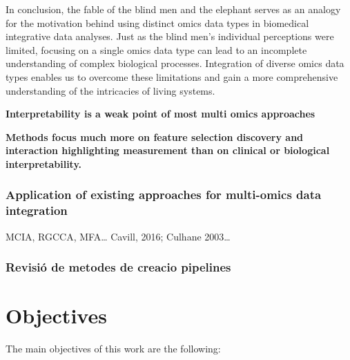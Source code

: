 \documentclass[a4paper, nobind]{templates/ociamthesis}
\renewcommand{\chaptermark}[1]{\markboth{\thechapter. #1}{\thechapter. #1}}
\begin{document}
In conclusion, the fable of the blind men and the elephant serves as an analogy for the motivation behind using distinct omics data types in biomedical integrative data analyses. Just as the blind men's individual perceptions were limited, focusing on a single omics data type can lead to an incomplete understanding of complex biological processes. Integration of diverse omics data types enables us to overcome these limitations and gain a more comprehensive understanding of the intricacies of living systems.

\textbf{Interpretability is a weak point of most multi omics approaches}

\textbf{Methods focus much more on feature selection discovery and interaction highlighting measurement than on clinical or biological interpretability.}

\hypertarget{application-of-existing-approaches-for-multi-omics-data-integration}{%
\subsection{Application of existing approaches for multi-omics data integration}\label{application-of-existing-approaches-for-multi-omics-data-integration}}

MCIA, RGCCA, MFA\ldots{} Cavill, 2016; Culhane 2003\ldots{}

\hypertarget{revisiuxf3-de-metodes-de-creacio-pipelines}{%
\subsection{Revisió de metodes de creacio pipelines}\label{revisiuxf3-de-metodes-de-creacio-pipelines}}

\hypertarget{objectives}{%
\chapter{Objectives}\label{objectives}}

\chaptermark{Objectives}

\noindent The main objectives of this work are the following:
\end{document}
